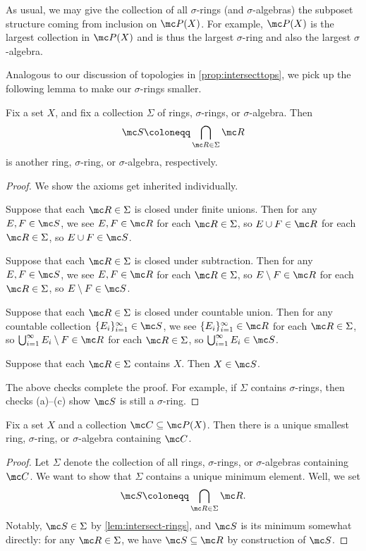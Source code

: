 \documentclass[../notes.tex]{subfiles}
\begin{document}
As usual, we may give the collection of all $\sigma$-rings (and $\sigma$-algebras) the subposet structure coming from inclusion on $\mc P(X)$. For example, $\mc P(X)$ is the largest collection in $\mc P(X)$ and is thus the largest $\sigma$-ring and also the largest $\sigma$-algebra.

Analogous to our discussion of topologies in \autoref{prop:intersecttops}, we pick up the following lemma to make our $\sigma$-rings smaller.
\begin{lemma} \label{lem:intersect-rings}
	Fix a set $X$, and fix a collection $\Sigma$ of rings, $\sigma$-rings, or $\sigma$-algebra. Then
	\[\mc S\coloneqq\bigcap_{\mc R\in\Sigma}\mc R\]
	is another ring, $\sigma$-ring, or $\sigma$-algebra, respectively.
\end{lemma}
\begin{proof}
	We show the axioms get inherited individually.
	\begin{listalph}
		\item Suppose that each $\mc R\in\Sigma$ is closed under finite unions. Then for any $E,F\in\mc S$, we see $E,F\in\mc R$ for each $\mc R\in\Sigma$, so $E\cup F\in\mc R$ for each $\mc R\in\Sigma$, so $E\cup F\in\mc S$.
		\item Suppose that each $\mc R\in\Sigma$ is closed under subtraction. Then for any $E,F\in\mc S$, we see $E,F\in\mc R$ for each $\mc R\in\Sigma$, so $E\setminus F\in\mc R$ for each $\mc R\in\Sigma$, so $E\setminus F\in\mc S$.
		\item Suppose that each $\mc R\in\Sigma$ is closed under countable union. Then for any countable collection $\{E_i\}_{i=1}^\infty\in\mc S$, we see $\{E_i\}_{i=1}^\infty\in\mc R$ for each $\mc R\in\Sigma$, so $\bigcup_{i=1}^\infty E_i\setminus F\in\mc R$ for each $\mc R\in\Sigma$, so $\bigcup_{i=1}^\infty E_i\in\mc S$.
		\item Suppose that each $\mc R\in\Sigma$ contains $X$. Then $X\in\mc S$.
	\end{listalph}
	The above checks complete the proof. For example, if $\Sigma$ contains $\sigma$-rings, then checks (a)--(c) show $\mc S$ is still a $\sigma$-ring.
\end{proof}
\begin{corollary} \label{cor:get-small-sigma-ring}
	Fix a set $X$ and a collection $\mc C\subseteq\mc P(X)$. Then there is a unique smallest ring, $\sigma$-ring, or $\sigma$-algebra containing $\mc C$.
\end{corollary}
\begin{proof}
	Let $\Sigma$ denote the collection of all rings, $\sigma$-rings, or $\sigma$-algebras containing $\mc C$. We want to show that $\Sigma$ contains a unique minimum element. Well, we set
	\[\mc S\coloneqq\bigcap_{\mc R\in\Sigma}\mc R.\]
	Notably, $\mc S\in\Sigma$ by \autoref{lem:intersect-rings}, and $\mc S$ is its minimum somewhat directly: for any $\mc R\in\Sigma$, we have $\mc S\subseteq\mc R$ by construction of $\mc S$.
\end{proof}
\end{document}
